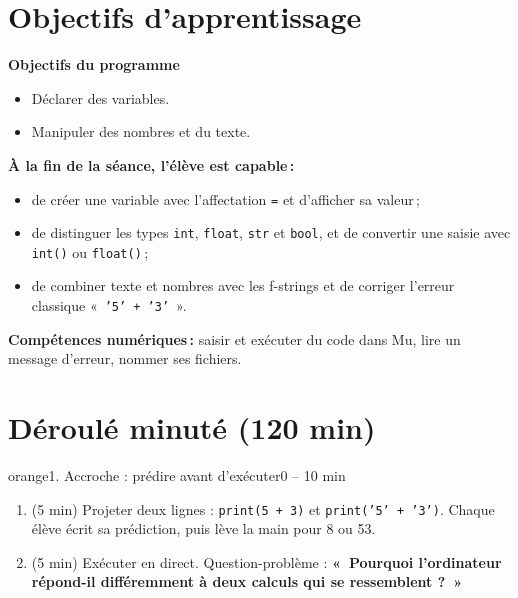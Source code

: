 \documentclass[11pt,a4paper]{article}
\begin{document}
\section{Objectifs d'apprentissage}
\begin{tcolorbox}[colback=gray!8,colframe=gray!60!black,arc=1mm,boxrule=0.5pt]
\textbf{Objectifs du programme}
\begin{itemize}
 \item Déclarer des variables.
 \item Manipuler des nombres et du texte.
\end{itemize}
\textbf{À la fin de la séance, l'élève est capable\,:}
\begin{itemize}
 \item de créer une variable avec l'affectation \texttt{=} et d'afficher sa valeur\,;
 \item de distinguer les types \texttt{int}, \texttt{float}, \texttt{str} et \texttt{bool}, et de convertir une saisie avec \texttt{int()} ou \texttt{float()}\,;
 \item de combiner texte et nombres avec les f-strings et de corriger l'erreur classique «~\texttt{'5' + '3'}~».
\end{itemize}
\textbf{Compétences numériques\,:} saisir et exécuter du code dans Mu, lire un message d'erreur, nommer ses fichiers.
\end{tcolorbox}

\section{Déroulé minuté (120 min)}

\begin{etape}{orange}{1. Accroche : prédire avant d'exécuter}{0 -- 10 min}
\begin{enumerate}
 \item (5 min) Projeter deux lignes : \texttt{print(5 + 3)} et \texttt{print('5' + '3')}. Chaque élève écrit sa prédiction, puis lève la main pour 8 ou 53.
 \item (5 min) Exécuter en direct. Question-problème : \textbf{«~Pourquoi l'ordinateur répond-il différemment à deux calculs qui se ressemblent ?~»}
\end{enumerate}
\end{etape}
\end{document}

